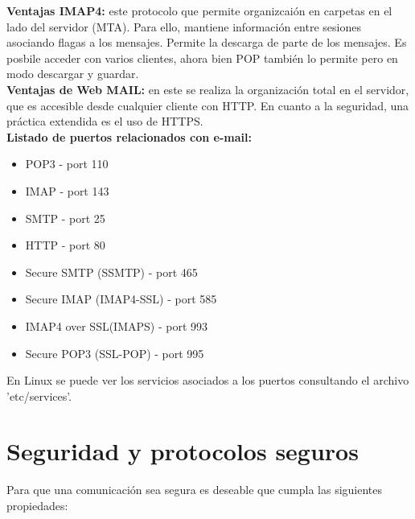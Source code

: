 \documentclass[a4paper,11pt]{article}
\begin{document}
\textbf{Ventajas IMAP4:} este protocolo que permite organizcaión en carpetas en el lado del servidor (MTA). Para ello, mantiene información entre sesiones asociando flagas a los mensajes. Permite la descarga de parte de los mensajes. Es posbile acceder con varios clientes, ahora bien POP también lo permite pero en modo descargar y guardar. \\

\textbf{Ventajas de Web MAIL:} en este se realiza la organización total en el servidor, que es accesible desde cualquier cliente con HTTP. En cuanto a la seguridad, una práctica extendida es el uso de HTTPS. \\

\textbf{Listado de puertos relacionados con e-mail:}

\begin{itemize}
\item POP3 - port 110
\item IMAP - port 143
\item SMTP - port 25
\item HTTP - port 80
\item Secure SMTP (SSMTP) - port 465
\item Secure IMAP (IMAP4-SSL) - port 585
\item IMAP4 over SSL(IMAPS) - port 993
\item Secure POP3 (SSL-POP) - port 995
\end{itemize}

En Linux se puede ver los servicios asociados a los puertos consultando el archivo 'etc/services'.

\section{Seguridad y protocolos seguros}
Para que una comunicación sea segura es deseable que cumpla las siguientes propiedades:
\end{document}
